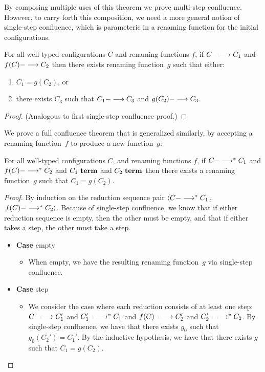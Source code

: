 By composing multiple uses of this theorem
we prove multi-step confluence.
However, to carry forth this composition, we need a more general
notion of single-step confluence, which is parameteric in a renaming
function for the initial configurations.

\begin{theorem}
For all well-typed configurations $C$ 
and renaming functions $f$,
%
 if $C ---> C_1$ 
and $f(C) ---> C_2$ 
then 
there exists renaming function~$g$ 
such that either:
\begin{enumerate}
\item %
$C_1 = g(C_2)$,
or
\item there exists $C_3$ such that $C_1 ---> C_3$ and $g(C_2) ---> C_3$.
\end{enumerate}
\begin{proof}
  (Analogous to first single-step confluence proof.)
\end{proof}
\end{theorem}

We prove a full confluence theorem that is generalized similarly, by
accepting a renaming function~$f$ to produce a new function~$g$:

\begin{theorem}
For all well-typed configurations $C$,
and renaming functions $f$,
%
 if $C --->^\ast C_1$ 
and $f(C) --->^\ast C_2$ 
and $C_1~\textbf{term}$
and $C_2~\textbf{term}$
then 
there exists a renaming function~$g$ 
such that $C_1 = g(C_2)$.
\begin{proof}
  By induction on the reduction sequence pair
  $\left< C --->^\ast C_1\right.$, 
  $\left.f(C) --->^\ast C_2 \right>$.
  Because of single-step confluence, we know that
  if either reduction sequence is empty, then the other must be empty,
  and that
  if either takes a step, the other must take a step.

   \begin{itemize}[leftmargin=*]
   \item[] \textbf{Case} empty
     \begin{itemize}[leftmargin=*]
       \item[] When empty, we have the resulting renaming function~$g$ via
         single-step confluence.
     \end{itemize}

   \item[] \textbf{Case} step
     \begin{itemize}[leftmargin=*]
       \item[] We consider the case where each reduction consists of at least
         one step: $C ---> C_1'$ and $C_1' --->^\ast C_1$ and
         $f(C) ---> C_2'$ and $C_2' --->^\ast C_2$.  By single-step
         confluence, we have that there exists $g_0$ such that $g_0(C_2') =
         C_1'$.  By the inductive hypothesis, we have that there exists $g$ such
         that $C_1 = g(C_2)$.
     \end{itemize}     
   \end{itemize}
\end{proof}
\end{theorem}
